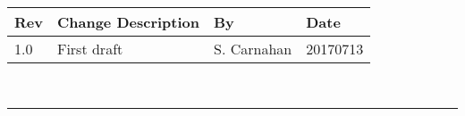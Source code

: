 \documentclass[]{BasiliskReportMemo}
\begin{document}
\makeCover

%
%
\pagestyle{empty}
{\renewcommand{\arraystretch}{2}
	\noindent
	\begin{longtable}{|p{0.5in}|p{3.5in}|p{1.07in}|p{0.9in}|}
		\hline
		{\bfseries Rev} & {\bfseries Change Description} & {\bfseries By}& {\bfseries Date} \\
		\hline
		1.0 & First draft & S. Carnahan &20170713\\
		\hline
		
	\end{longtable}
}

\newpage
\setcounter{page}{1}
\pagestyle{fancy}

\tableofcontents %
~\\ \hrule ~\\ %
	








\end{document}
